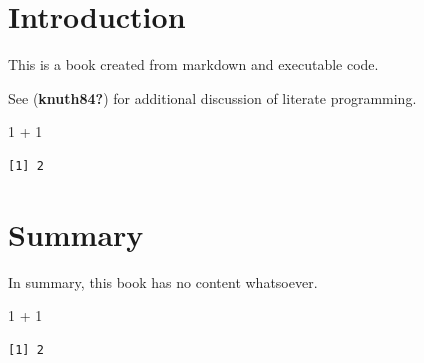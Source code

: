 \documentclass[
  letterpaper,
  DIV=11,
  numbers=noendperiod]{scrreprt}
\newenvironment{Shaded}{\begin{snugshade}}{\end{snugshade}}
\newcommand{\DecValTok}[1]{\textcolor[rgb]{0.68,0.00,0.00}{#1}}
\newcommand{\SpecialCharTok}[1]{\textcolor[rgb]{0.37,0.37,0.37}{#1}}
\begin{document}
\cleardoublepage
{}
{}
\appendix

\hypertarget{introduction-1}{%
\chapter{Introduction}\label{introduction-1}}

This is a book created from markdown and executable code.

See (\textbf{knuth84?}) for additional discussion of literate
programming.

\begin{Shaded}
\begin{Highlighting}[]
\DecValTok{1} \SpecialCharTok{+} \DecValTok{1}
\end{Highlighting}
\end{Shaded}

\begin{verbatim}
[1] 2
\end{verbatim}

\hypertarget{summary-1}{%
\chapter{Summary}\label{summary-1}}

In summary, this book has no content whatsoever.

\begin{Shaded}
\begin{Highlighting}[]
\DecValTok{1} \SpecialCharTok{+} \DecValTok{1}
\end{Highlighting}
\end{Shaded}

\begin{verbatim}
[1] 2
\end{verbatim}
\end{document}
